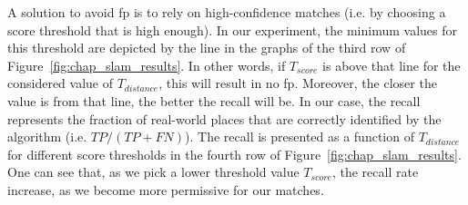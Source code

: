 A solution to avoid \gls*{fp} is to rely on high-confidence matches (i.e. by choosing a score threshold that is high enough). In our experiment, the minimum values for this threshold are depicted by the line in the graphs of the third row of Figure~\ref{fig:chap_slam_results}. In other words, if $T_{score}$ is above that line for the considered value of $T_{distance}$, this will result in no \gls*{fp}. Moreover, the closer the value is from that line, the better the recall will be. In our case, the recall represents the fraction of real-world places that are correctly identified by the algorithm (i.e. $TP/(TP+FN)$). The recall is presented as a function of $T_{distance}$ for different score thresholds in the fourth row of Figure~\ref{fig:chap_slam_results}. One can see that, as we pick a lower threshold value $T_{score}$, the recall rate increase, as we become more permissive for our matches. 

